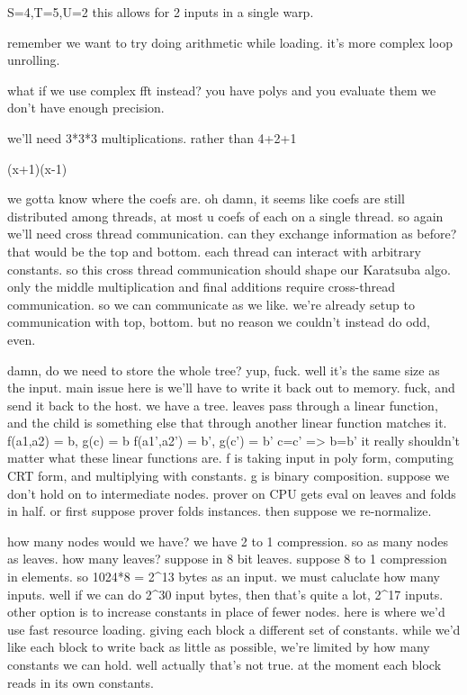 S=4,T=5,U=2
this allows for 2 inputs in a single warp.

remember we want to try doing arithmetic while loading. it's more complex loop unrolling. 

what if we use complex fft instead?
you have polys and you evaluate them we don't have enough precision.

we'll need 3*3*3 multiplications. rather than 4+2+1

(x+1)(x-1)

we gotta know where the coefs are.
oh damn, it seems like coefs are still distributed among threads, at most u coefs of each on a single thread.
so again we'll need cross thread communication.
can they exchange information as before? that would be the top and bottom. 
each thread can interact with arbitrary constants. 
so this cross thread communication should shape our Karatsuba algo.
only the middle multiplication and final additions require cross-thread communication. 
so we can communicate as we like. 
we're already setup to communication with top, bottom. but no reason we couldn't instead do odd, even.

damn, do we need to store the whole tree?
yup, fuck. well it's the same size as the input. main issue here is we'll have to write it back out to memory. fuck, and send it back to the host. 
we have a tree. leaves pass through a linear function, and the child is something else that through another linear function matches it.
f(a1,a2) = b, g(c) = b
f(a1',a2') = b', g(c') = b'
c=c' => b=b'
it really shouldn't matter what these linear functions are.
f is taking input in poly form, computing CRT form, and multiplying with constants. g is binary composition. 
suppose we don't hold on to intermediate nodes. prover on CPU gets eval on leaves and folds in half. or first suppose prover folds instances. then suppose we re-normalize. 

how many nodes would we have?
we have 2 to 1 compression. so as many nodes as leaves. how many leaves? suppose in 8 bit leaves. suppose 8 to 1 compression in elements. so 1024*8 = 2^13 bytes as an input. we must caluclate how many inputs. well if we can do 2^30 input bytes, then that's quite a lot, 2^17 inputs.
other option is to increase constants in place of fewer nodes. here is where we'd use fast resource loading. giving each block a different set of constants. while we'd like each block to write back as little as possible, we're limited by how many constants we can hold.
well actually that's not true. at the moment each block reads in its own constants. 

